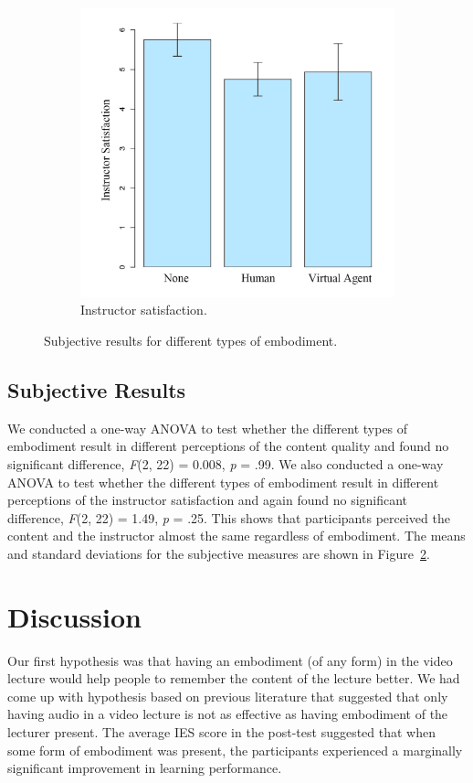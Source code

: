 \documentclass{sigchi}
\begin{document}
\begin{figure}[t]
\begin{subfigure}{0.4\textwidth}
        \includegraphics[width=\textwidth]{Figures/Instructor.jpg}
        \caption{Instructor satisfaction.}
        \label{fig:Instructor}
    \end{subfigure}
    
    \caption{Subjective results for different types of embodiment.}
    \label{fig:Subjective}
\end{figure}

\subsection{Subjective Results}

We conducted a one-way ANOVA to test whether the different types of embodiment result in different perceptions of the content quality and found no significant difference, \textit{F}(2, 22) = 0.008, \textit{p} = .99. We also conducted a one-way ANOVA to test whether the different types of embodiment result in different perceptions of the instructor satisfaction and again found no significant difference, \textit{F}(2, 22) = 1.49, \textit{p} = .25. This shows that participants perceived the content and the instructor almost the same regardless of embodiment. The means and standard deviations for the subjective measures are shown in Figure~\ref{fig:Subjective}.


\section{Discussion}
Our first hypothesis was that having an embodiment (of any form) in the video lecture would help people to remember the content of the lecture better. We had come up with hypothesis based on previous literature that suggested that only having audio in a video lecture is not as effective as having embodiment of the lecturer present. The average IES score in the post-test suggested that when some form of embodiment was present, the participants experienced a marginally significant improvement in learning performance.
\end{document}

